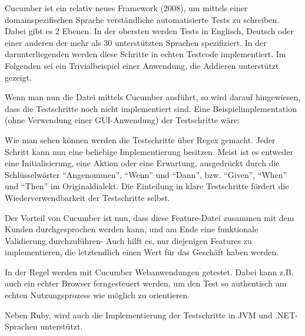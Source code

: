 Cucumber ist ein relativ neues Framework (2008), um mittels einer domainspezifischen Sprache verständliche automatisierte Tests zu schreiben. Dabei gibt es 2 Ebenen. In der obersten werden Tests in Englisch, Deutsch oder einer anderen der mehr als 30 unterstützten Sprachen spezifiziert. In der darunterliegenden werden diese Schritte in echten Testcode implementiert. Im Folgenden sei ein Trivialbeispiel einer Anwendung, die Addieren unterstützt gezeigt.



Wenn man nun die Datei mittels Cucumber ausführt, so wird darauf hingewiesen, dass die Testschritte noch nicht implementiert sind.
Eine Beispielimplementation (ohne Verwendung einer GUI-Anwendung) der Testschritte wäre:



Wie man sehen können werden die Testschritte über Regex gemacht. Jeder Schritt kann nun eine beliebige Implementierung besitzen. Meist ist es entweder eine Initialisierung, eine Aktion oder eine Erwartung, ausgedrückt durch die Schlüsselwörter "`Angenommen"', "`Wenn"' und "`Dann"', bzw. "`Given"', "`When"' und "`Then"' im Originaldialekt. Die Einteilung in klare Testschritte fördert die Wiederverwendbarkeit der Testschritte selbst.

Der Vorteil von Cucumber ist nun, dass diese Feature-Datei zusammen mit dem Kunden durchgesprochen werden kann, und am Ende eine funktionale Validierung durchzuführen- Auch hilft es, nur diejenigen Features zu implementieren, die letztendlich einen Wert für das Geschäft haben werden. 
 
In der Regel werden mit Cucumber Webanwendungen getestet. Dabei kann z.B. auch ein echter Browser ferngesteuert werden, um den Test so authentisch am echten Nutzungsprozess wie möglich zu orientieren. 

Neben Ruby, wird auch die Implementierung der Testschritte in JVM und .NET-Sprachen unterstützt.